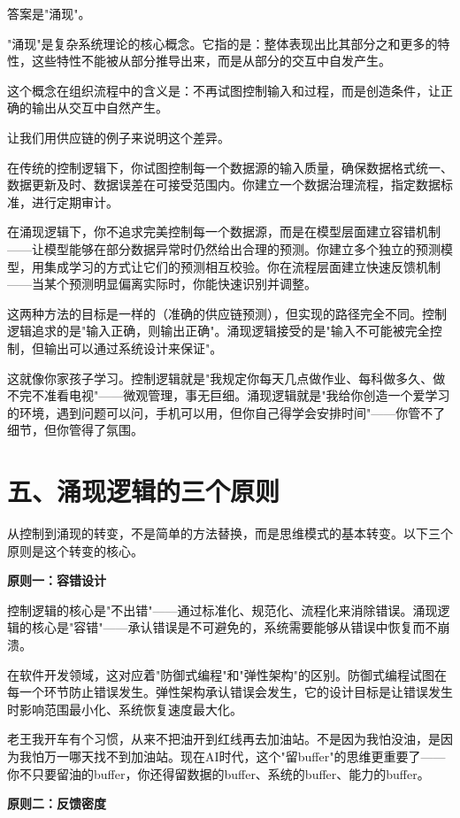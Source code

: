 答案是"涌现"。

"涌现"是复杂系统理论的核心概念。它指的是：整体表现出比其部分之和更多的特性，这些特性不能被从部分推导出来，而是从部分的交互中自发产生。

这个概念在组织流程中的含义是：不再试图控制输入和过程，而是创造条件，让正确的输出从交互中自然产生。

让我们用供应链的例子来说明这个差异。

在传统的控制逻辑下，你试图控制每一个数据源的输入质量，确保数据格式统一、数据更新及时、数据误差在可接受范围内。你建立一个数据治理流程，指定数据标准，进行定期审计。

在涌现逻辑下，你不追求完美控制每一个数据源，而是在模型层面建立容错机制——让模型能够在部分数据异常时仍然给出合理的预测。你建立多个独立的预测模型，用集成学习的方式让它们的预测相互校验。你在流程层面建立快速反馈机制——当某个预测明显偏离实际时，你能快速识别并调整。

这两种方法的目标是一样的（准确的供应链预测），但实现的路径完全不同。控制逻辑追求的是"输入正确，则输出正确"。涌现逻辑接受的是"输入不可能被完全控制，但输出可以通过系统设计来保证"。

这就像你家孩子学习。控制逻辑就是"我规定你每天几点做作业、每科做多久、做不完不准看电视"——微观管理，事无巨细。涌现逻辑就是"我给你创造一个爱学习的环境，遇到问题可以问，手机可以用，但你自己得学会安排时间"——你管不了细节，但你管得了氛围。

\section{五、涌现逻辑的三个原则}


从控制到涌现的转变，不是简单的方法替换，而是思维模式的基本转变。以下三个原则是这个转变的核心。

\textbf{原则一：容错设计}

控制逻辑的核心是"不出错"——通过标准化、规范化、流程化来消除错误。涌现逻辑的核心是"容错"——承认错误是不可避免的，系统需要能够从错误中恢复而不崩溃。

在软件开发领域，这对应着"防御式编程"和"弹性架构"的区别。防御式编程试图在每一个环节防止错误发生。弹性架构承认错误会发生，它的设计目标是让错误发生时影响范围最小化、系统恢复速度最大化。

老王我开车有个习惯，从来不把油开到红线再去加油站。不是因为我怕没油，是因为我怕万一哪天找不到加油站。现在AI时代，这个"留buffer"的思维更重要了——你不只要留油的buffer，你还得留数据的buffer、系统的buffer、能力的buffer。

\textbf{原则二：反馈密度}

